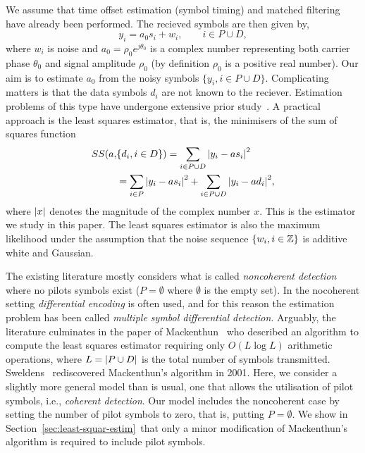 \documentclass[journal]{IEEEtran}
\begin{document}
We assume that time offset estimation (symbol timing) and matched filtering have already been performed.  The recieved symbols are then given by,
\begin{equation}\label{eq:sigmod}
y_i = a_0 s_i + w_i, \qquad i \in P \cup D,
\end{equation}
where $w_i$ is noise and $a_0 = \rho_0 e^{j\theta_0}$ is a complex number representing both carrier phase $\theta_0$ and signal amplitude $\rho_0$ (by definition $\rho_0$ is a positive real number).  Our aim is to estimate $a_0$ from the noisy symbols $\{ y_i, i \in P \cup D \}$.  Complicating matters is that the data symbols $d_i$ are not known to the reciever.  Estimation problems of this type have undergone extensive prior study~\cite{Wilson1989,Makrakis1990,Liu1991,Mackenthun1994,Sweldens2001}.  A practical approach is the least squares estimator, that is, the minimisers of the sum of squares function
\begin{align*}
SS(a, &\{d_i, i \in D\}) = \sum_{i \in P \cup D} {\left|  y_i - a s_i  \right|}^2 \\
&= \sum_{i \in P} {\left|  y_i - a s_i  \right|}^2 + \sum_{i \in P \cup D} {\left|  y_i - a d_i  \right|}^2,
\end{align*}
where ${\left| x \right|}$ denotes the magnitude of the complex number $x$.  This is the estimator we study in this paper.  The least squares estimator is also the maximum likelihood under the assumption that the noise sequence $\{w_i, i \in {\mathbb Z}\}$ is additive white and Gaussian.

The existing literature mostly considers what is called \emph{noncoherent detection} where no pilots symbols exist ($P = \emptyset$ where $\emptyset$ is the empty set).  In the nocoherent setting \emph{differential encoding} is often used, and for this reason the estimation problem has been called \emph{multiple symbol differential detection}.  Arguably, the literature culminates in the paper of Mackenthun~\cite{Mackenthun1994} who described an algorithm to compute the least squares estimator requiring only $O(L \log L)$ arithmetic operations, where $L = {\left| P \cup D \right|}$ is the total number of symbols transmitted.  Sweldens~\cite{Sweldens2001} rediscovered Mackenthun's algorithm in 2001.  Here, we consider a slightly more general model than is usual, one that allows the utilisation of pilot symbols, i.e., \emph{coherent detection}.  Our model includes the noncoherent case by setting the number of pilot symbols to zero, that is, putting $P = \emptyset$.  We show in Section~\ref{sec:least-squar-estim}~that only a minor modification of Mackenthun's algorithm is required to include pilot symbols.
\end{document}

